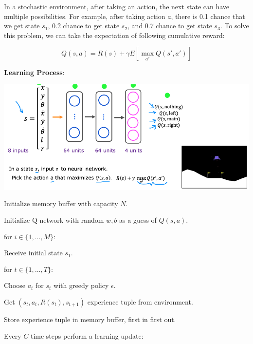 \documentclass{article}
\begin{document}
\noindent In a stochastic environment, after taking an action, the next state can have multiple possibilities. For example, after taking action \(a\), there is 0.1 chance that we get state \(s_1\), 0.2 chance to get state \(s_2\), and 0.7 chance to get state \(s_3\). To solve this problem, we can take the expectation of following cumulative reward:

\[Q(s, a) = R(s) + \gamma E[\max_{a'} Q(s', a')]\]

\noindent \textbf{Learning Process}:

\begin{center}
\includegraphics[scale=0.3]{./images/q_learning_nn.png}
\end{center}

\noindent Initialize memory buffer with capacity \(N\).

\noindent Initialize Q-network with random \(w, b\) as a guess of \(Q(s, a)\).

\noindent for \(i \in \{1, \dots, M\}\):

\noindent \hspace{.5cm} Receive initial state \(s_1\).

\noindent \hspace{.5cm} for \(t \in \{1, \dots, T\}\):

\noindent \hspace{1cm} Choose \(a_{t}\) for \(s_{t}\) with greedy policy \(\epsilon\).

\noindent \hspace{1cm} Get \((s_{t}, a_{t}, R(s_{t}), s_{t+1})\) experience tuple from environment.

\noindent \hspace{1cm} Store experience tuple in memory buffer, first in first out.

\bigskip

\noindent \hspace{1cm} Every \(C\) time steps perform a learning update:
\end{document}
